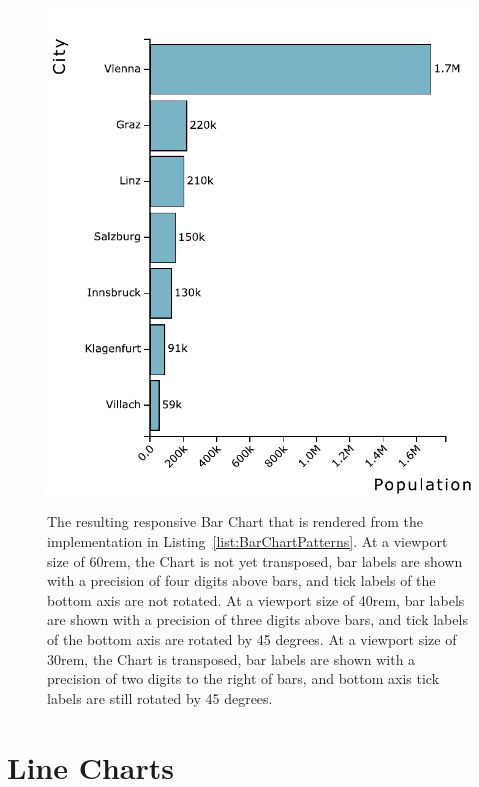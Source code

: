 \begin{figure}[tp]
{  \includegraphics[valign=b,scale=\respscale]{diagrams/respvis-bar-30rem.pdf}%
  \label{fig:BarChartPatterns30rem}%
}
\caption[Responsive RespVis Bar Chart]{
  The resulting responsive Bar Chart that is rendered from the implementation in Listing~\ref{list:BarChartPatterns}.
   At a viewport size of 60rem, the Chart is not yet transposed, bar labels are shown with a precision of four digits above bars, and tick labels of the bottom axis are not rotated.
   At a viewport size of 40rem, bar labels are shown with a precision of three digits above bars, and tick labels of the bottom axis are rotated by 45 degrees.
   At a viewport size of 30rem, the Chart is transposed, bar labels are shown with a precision of two digits to the right of bars, and bottom axis tick labels are still rotated by 45 degrees.
}
\label{fig:BarChartPatterns}
\end{figure}

\section{Line Charts}
\label{sec:LineChartsUsage}

